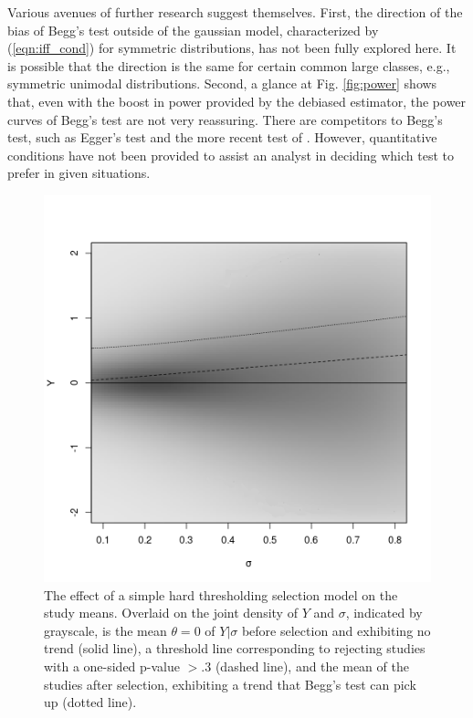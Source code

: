\documentclass[12pt]{article}
\newcommand{\y}{Y}
\newcommand{\s}{S}
\DeclareMathOperator{\E}{E}
\begin{document}
  Various avenues of further research suggest themselves. First, the
  direction of the bias of Begg's test outside of the gaussian model,
  characterized by (\ref{eqn:iff_cond}) for symmetric distributions,
  has not been fully explored here. It is possible that the direction
  is the same for certain common large classes, e.g., symmetric unimodal
  distributions. %
  Second, a glance at
  Fig. \ref{fig:power} shows that, even with the boost in power
  provided by the debiased estimator, the power curves of Begg's test
  are not very reassuring. There are competitors to Begg's test, such
  as Egger's test and the more recent test of \citet{lin2018}. However, 
  quantitative conditions have not been provided to assist an analyst
  in deciding which test to prefer in given situations.

\begin{figure}
  \includegraphics[width=\linewidth]{selection.png}
  \caption{  The effect of a simple hard thresholding selection model on the
  study means. Overlaid on the joint density of $\y$ and $\sigma$, indicated by grayscale, is the mean $\theta=0$ of $\y|\sigma$
  before selection and exhibiting no
  trend (solid line), a threshold line corresponding to rejecting studies with a one-sided p-value
  $>.3$ (dashed line), and the mean of the studies
  after selection, exhibiting a trend that Begg's test can pick up (dotted line).
}
  \label{fig:selection}
\end{figure}
  
\end{document}
